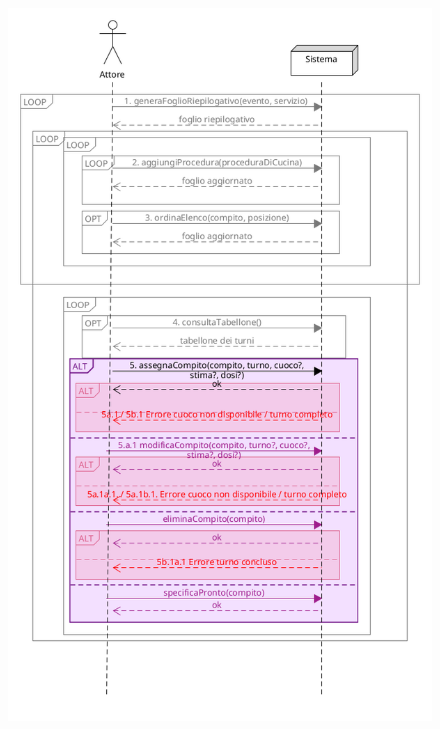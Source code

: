 \begin{figure}[h]
    \begin{center}
      \includegraphics[scale = 0.44]{images/SSD/SSD - Passo 5.png}
    \end{center}
\end{figure}